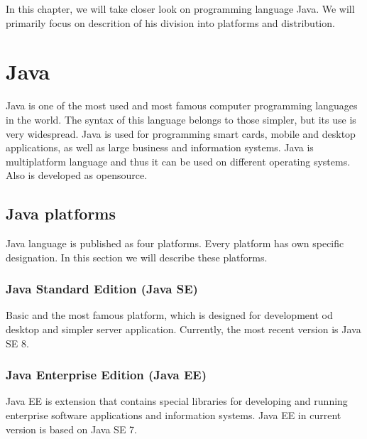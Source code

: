 In this chapter, we will take closer look on programming language Java. We will primarily focus on descrition of his division into platforms and distribution.

\section{Java}
Java \cite{JavaBook} is one of the most used and most famous computer programming languages in the world. The syntax of this language belongs to those simpler, but its use is very widespread. Java is used for programming smart cards, mobile and desktop applications, as well as large business and information systems. Java is multiplatform language and thus it can be used on different operating systems. Also is developed as opensource.  


\subsection{Java platforms}
Java language is published as four platforms. Every platform has own specific designation. In this section we will describe these platforms.

\subsubsection{Java Standard Edition (Java SE)}
Basic and the most famous platform, which is designed for development od desktop and simpler server application. Currently, the most recent version is Java SE 8.

\subsubsection{Java Enterprise Edition (Java EE)}
Java EE is extension that contains special libraries for developing and running enterprise software applications and information systems. Java EE in current version is based on Java SE 7.

